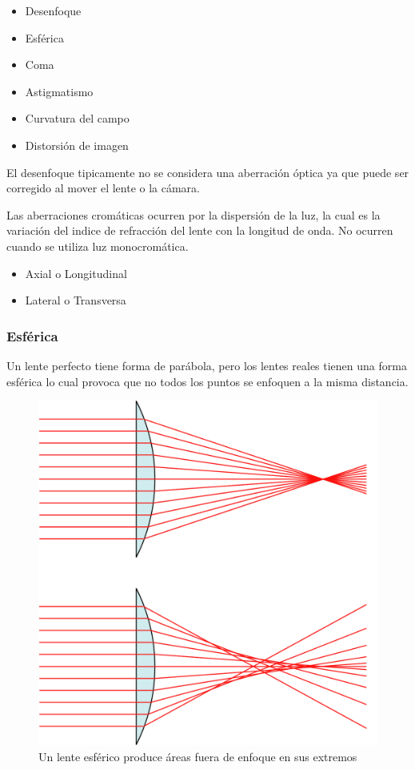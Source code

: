 \documentclass{article}
\begin{document}
\begin{itemize}
	\item Desenfoque
	\item Esférica
	\item Coma
	\item Astigmatismo
	\item Curvatura del campo
	\item Distorsión de imagen
\end{itemize}

El desenfoque tipicamente no se considera una aberración óptica ya que puede ser corregido al mover el lente o la cámara.

Las aberraciones cromáticas ocurren por la dispersión de la luz, la cual es la variación del indice de refracción del lente con la longitud de onda. No ocurren cuando se utiliza luz monocromática.

\begin{itemize}
	\item Axial o Longitudinal
	\item Lateral o Transversa
\end{itemize}


\subsubsection{Esférica}

Un lente perfecto tiene forma de parábola, pero los lentes reales tienen una forma esférica lo cual provoca que no todos los puntos se enfoquen a la misma distancia.

\begin{figure}[H]
	\centering
	\includegraphics[width=0.55\linewidth]{Figuras/Spherical_Aberration}
	\caption{Un lente esférico produce áreas fuera de enfoque en sus extremos}
	\label{fig:sphericalaberration}
\end{figure}
\end{document}

